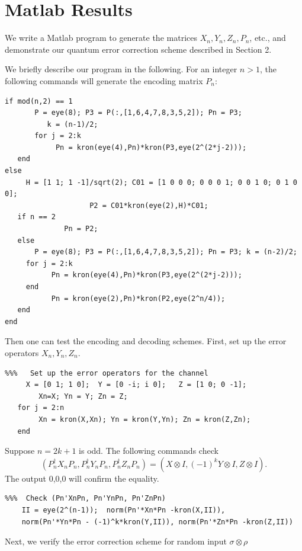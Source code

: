 \documentclass[11pt]{article}
\begin{document}
\section{Matlab Results}

We write a Matlab program to generate the matrices $X_n, Y_n, Z_n, P_n$,
etc.,  and demonstrate our quantum error correction scheme
described in Section 2.

We briefly describe our program in the following.
For an integer $n > 1$, the following commands will generate the encoding 
matrix $P_n$:
\begin{verbatim}
if mod(n,2) == 1   
       P = eye(8); P3 = P(:,[1,6,4,7,8,3,5,2]); Pn = P3;
          k = (n-1)/2;
       for j = 2:k
            Pn = kron(eye(4),Pn)*kron(P3,eye(2^(2*j-2)));
   end 
else 
     H = [1 1; 1 -1]/sqrt(2); C01 = [1 0 0 0; 0 0 0 1; 0 0 1 0; 0 1 0 0]; 
                    P2 = C01*kron(eye(2),H)*C01;   
   if n == 2
              Pn = P2;
   else
       P = eye(8); P3 = P(:,[1,6,4,7,8,3,5,2]); Pn = P3; k = (n-2)/2;
     for j = 2:k
           Pn = kron(eye(4),Pn)*kron(P3,eye(2^(2*j-2)));
     end  
           Pn = kron(eye(2),Pn)*kron(P2,eye(2^n/4));
   end
end
\end{verbatim}
Then one can test the encoding and decoding schemes. First, set up the error operators
$X_n, Y_n, Z_n$. 
\begin{verbatim}
%%%   Set up the error operators for the channel
     X = [0 1; 1 0];  Y = [0 -i; i 0];   Z = [1 0; 0 -1];  
        Xn=X; Yn = Y; Zn = Z;
   for j = 2:n
        Xn = kron(X,Xn); Yn = kron(Y,Yn); Zn = kron(Z,Zn);
   end
\end{verbatim}
Suppose $n = 2k+1$ is odd. The following commands check 
\begin{equation} \label{odd-a}
(P_n^\dag X_nP_n, P_n^\dag Y_nP_n, P_n^\dag Z_nP_n) = 
(X\otimes I, (-1)^k Y \otimes I, Z\otimes I).
\end{equation}
The output 0,0,0 will confirm the equality.
\begin{verbatim}
%%%  Check (Pn'XnPn, Pn'YnPn, Pn'ZnPn)
    II = eye(2^(n-1));  norm(Pn'*Xn*Pn -kron(X,II)), 
    norm(Pn'*Yn*Pn - (-1)^k*kron(Y,II)), norm(Pn'*Zn*Pn -kron(Z,II))
\end{verbatim}
Next, we verify the error correction scheme for random input $\sigma \otimes \rho$
\end{document}
